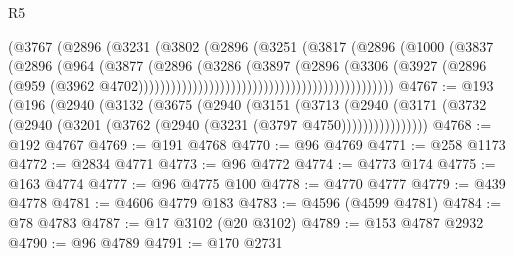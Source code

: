 \begin{lexlean}{R5}
\begin{coremodule}
                                                      (@3767
                                                        (@2896
                                                          (@3231
                                                            (@3802
                                                              (@2896
                                                                (@3251
                                                                  (@3817
                                                                    (@2896
                                                                      (@1000
                                                                        (@3837
                                                                          (@2896
                                                                            (@964
                                                                              (@3877
                                                                                (@2896
                                                                                  (@3286
                                                                                    (@3897
                                                                                      (@2896
                                                                                        (@3306
                                                                                          (@3927
                                                                                            (@2896
                                                                                              (@959
                                                                                                (@3962
                                                                                                  @4702)))))))))))))))))))))))))))))))))))))))))))))))
@4767 := @193
    (@196
      (@2940
        (@3132
          (@3675
            (@2940
              (@3151
                (@3713
                  (@2940
                    (@3171 (@3732 (@2940 (@3201 (@3762 (@2940 (@3231 (@3797 @4750))))))))))))))))
@4768 := @192 @4767
@4769 := @191 @4768
@4770 := @96 @4769
@4771 := @258 @1173
@4772 := @2834 @4771
@4773 := @96 @4772
@4774 := @4773 @174
@4775 := @163 @4774
@4777 := @96 @4775 @100
@4778 := @4770 @4777
@4779 := @439 @4778
@4781 := @4606 @4779 @183
@4783 := @4596 (@4599 @4781)
@4784 := @78 @4783
@4787 := @17 @3102 (@20 @3102)
@4789 := @153 @4787 @2932
@4790 := @96 @4789
@4791 := @170 @2731

\end{coremodule}
\end{lexlean}
